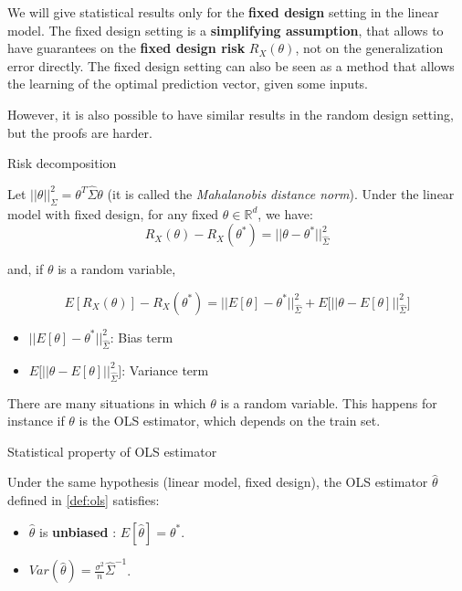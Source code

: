 \documentclass[
10pt, %
a4paper, %
oneside, %
headinclude,footinclude, %
BCOR5mm, %
]{scrartcl}
\begin{document}
We will give statistical results only for the \textbf{{fixed design}} setting in the linear model. The fixed design setting is a \textbf{{simplifying assumption}}, that allows to have guarantees on the \textbf{{fixed design risk}} $R_X(\theta)$, not on the generalization error directly. The fixed design setting can also be seen as a method that allows the learning of the optimal prediction vector, given some inputs.

However, it is also possible to have similar results in the random design setting, but the proofs are harder.

\begin{proposition}{Risk decomposition}

    Let $||\theta||_{\Sigma}^2 = \theta^T\hat{\Sigma} \theta$ (it is called the \textit{{Mahalanobis distance norm}}).  Under the linear model with fixed design, for any fixed $\theta \in \mathbb{R}^d$, we have:
    \begin{equation}
	R_X(\theta)-R_X( \theta^*) = ||\theta-\theta^*||_{\hat{\Sigma}}^2
    \end{equation}

    and, if $\theta$ is a random variable,

    \begin{equation}
	E[R_X(\theta)]-R_X(\theta^*) = ||E[\theta]-\theta^*||_{\hat{\Sigma}}^2+E\Big[||\theta-E[\theta]||_{\hat{\Sigma}}^2\Big]
    \end{equation}
    \begin{itemize}
	\item $||E[\theta]-\theta^*||_{\hat{\Sigma}}^2$: Bias term
	\item $E\Big[||\theta-E[\theta]||_{\hat{\Sigma}}^2\Big]$: Variance term
    \end{itemize}
\end{proposition}

\begin{remark}
    There are many situations in which $\theta$ is a random variable. This happens for instance if $\theta$ is the OLS estimator, which depends on the train set.
\end{remark}

\begin{proposition}{Statistical property of OLS estimator}

    Under the same hypothesis (linear model, fixed design), the OLS estimator $ \hat{\theta}$ defined in \ref{def:ols} satisfies:

    \begin{itemize}
	\item $ \hat{\theta}$ is \textbf{{unbiased}} : $ E[ \hat{\theta}] = \theta^*$.
	\item $ Var( \hat{\theta}) = \frac{\sigma^2}{n} \hat{\Sigma}^{-1}$.
    \end{itemize}
\end{proposition}
    
\end{document}
